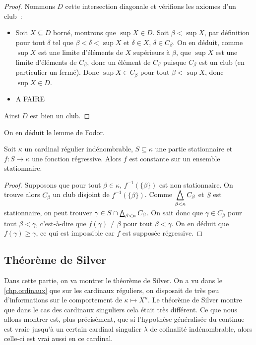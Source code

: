 \begin{proof}
  Nommons $D$ cette intersection diagonale et vérifions les axiomes d'un club~:
  \begin{itemize}
  \item Soit $X\subseteq D$ borné, montrons que $\sup X \in D$. Soit
    $\beta < \sup X$, par définition pour tout $\delta$ tel que
    $\beta<\delta<\sup X$ et $\delta \in X$, $\delta \in C_\beta$. On en déduit,
    comme $\sup X$ est une limite d'éléments de $X$ supérieurs à $\beta$,
    que $\sup X$ est une limite d'éléments de $C_\beta$, donc un élément de
    $C_\beta$ puisque $C_\beta$ est un club (en particulier un fermé). Donc
    $\sup X\in C_\beta$ pour tout $\beta < \sup X$, donc $\sup X \in D$.
  \item A FAIRE
  \end{itemize}
  Ainsi $D$ est bien un club.
\end{proof}

On en déduit le lemme de Fodor.

\begin{lemma}[Fodor]
  Soit $\kappa$ un cardinal régulier indénombrable, $S \subseteq \kappa$ une
  partie stationnaire et $f : S \to \kappa$ une fonction régressive. Alors
  $f$ est constante sur un ensemble stationnaire.
\end{lemma}

\begin{proof}
  Supposons que pour tout $\beta \in \kappa$, $f^{-1}(\{\beta\})$ est non
  stationnaire. On trouve alors $C_\beta$ un club disjoint de
  $f^{-1}(\{\beta\})$. Comme $\displaystyle\bigtriangleup_{\beta < \kappa} C_\beta$
  et $S$ est stationnaire, on peut trouver
  $\gamma \in S\cap \bigtriangleup_{\beta < \kappa} C_\beta$. On sait donc que
  $\gamma \in C_\beta$ pour tout $\beta < \gamma$, c'est-à-dire que
  $f(\gamma) \neq \beta$ pour tout $\beta < \gamma$. On en déduit que
  $f(\gamma) \geq \gamma$, ce qui est impossible car $f$ est supposée
  régressive.
\end{proof}

\subsection{Théorème de Silver}

Dans cette partie, on va montrer le théorème de Silver. On a vu dans le
\cref{chp.ordinaux} que sur les cardinaux réguliers, on disposait de très peu
d'informations sur le comportement de $\kappa \mapsto X^\kappa$. Le théorème de
Silver montre que dans le cas des cardinaux singuliers cela était très
différent. Ce que nous allons montrer est, plus précisément, que si l'hypothèse
généralisée du continue est vraie jusqu'à un certain cardinal singulier
$\lambda$ de cofinalité indénombrable, alors celle-ci est vrai aussi en ce
cardinal.

